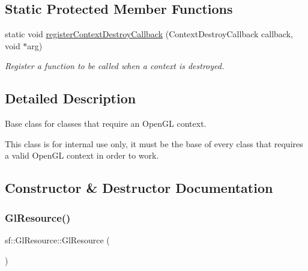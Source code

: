\subsection*{Static Protected Member Functions}
\begin{DoxyCompactItemize}
\item 
static void \mbox{\hyperlink{classsf_1_1_gl_resource_ab171bdaf5eb36789da14b30a846db471}{register\+Context\+Destroy\+Callback}} (Context\+Destroy\+Callback callback, void $\ast$arg)
\begin{DoxyCompactList}\small\item\em Register a function to be called when a context is destroyed. \end{DoxyCompactList}\end{DoxyCompactItemize}


\subsection{Detailed Description}
Base class for classes that require an Open\+GL context. 

\begin{DoxyVerb}\end{DoxyVerb}


This class is for internal use only, it must be the base of every class that requires a valid Open\+GL context in order to work. \begin{DoxyVerb}\end{DoxyVerb}
 

\subsection{Constructor \& Destructor Documentation}
\mbox{\label{classsf_1_1_gl_resource_ad8fb7a0674f0f77e530dacc2a3b0dc6a}} 
\subsubsection{\texorpdfstring{GlResource()}{GlResource()}}
{\footnotesize\ttfamily sf\+::\+Gl\+Resource\+::\+Gl\+Resource (\begin{DoxyParamCaption}{ }\end{DoxyParamCaption})\hspace{0.3cm}{\ttfamily [protected]}}



